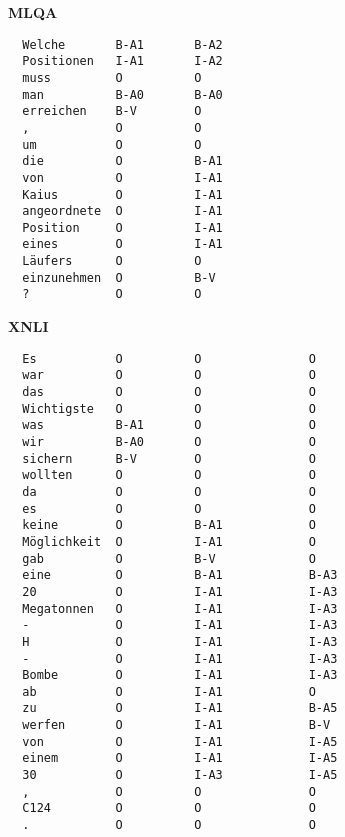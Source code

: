 \textbf{MLQA}

\begin{verbatim}
  Welche       B-A1       B-A2
  Positionen   I-A1       I-A2
  muss         O          O
  man          B-A0       B-A0
  erreichen    B-V        O
  ,            O          O
  um           O          O
  die          O          B-A1
  von          O          I-A1
  Kaius        O          I-A1
  angeordnete  O          I-A1
  Position     O          I-A1
  eines        O          I-A1
  Läufers      O          O
  einzunehmen  O          B-V
  ?            O          O
\end{verbatim}

\textbf{XNLI}

\begin{verbatim}
  Es           O          O               O
  war          O          O               O
  das          O          O               O
  Wichtigste   O          O               O
  was          B-A1       O               O
  wir          B-A0       O               O
  sichern      B-V        O               O
  wollten      O          O               O
  da           O          O               O
  es           O          O               O
  keine        O          B-A1            O
  Möglichkeit  O          I-A1            O
  gab          O          B-V             O
  eine         O          B-A1            B-A3
  20           O          I-A1            I-A3
  Megatonnen   O          I-A1            I-A3
  -            O          I-A1            I-A3
  H            O          I-A1            I-A3
  -            O          I-A1            I-A3
  Bombe        O          I-A1            I-A3
  ab           O          I-A1            O
  zu           O          I-A1            B-A5
  werfen       O          I-A1            B-V
  von          O          I-A1            I-A5
  einem        O          I-A1            I-A5
  30           O          I-A3            I-A5
  ,            O          O               O
  C124         O          O               O
  .            O          O               O
\end{verbatim}





